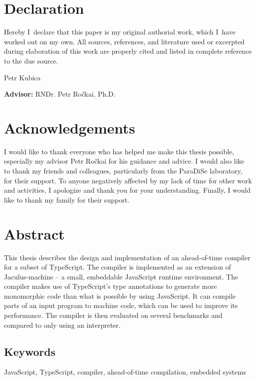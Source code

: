 \section*{Declaration} Hereby I~declare that this paper is my original authorial work, which
I~have worked out on my own. All sources, references, and literature
used or excerpted during elaboration of this work are properly cited
and listed in complete reference to the due source.

\vspace{1cm}
\begin{flushright}
Petr Kubica
\end{flushright}

\vfill\noindent
\textbf{Advisor:} RNDr. Petr Ročkai, Ph.D.   %
\cleardoublepage

\section*{Acknowledgements} %
I would like to thank everyone who has helped me make this thesis possible, especially my advisor Petr Ročkai for his guidance and advice. I would also like to thank my friends and colleagues, particularly from the ParaDiSe laboratory, for their support. To anyone negatively affected by my lack of time for other work and activities, I apologize and thank you for your understanding. Finally, I would like to thank my family for their support.
\cleardoublepage

\section*{Abstract} %
This thesis describes the design and implementation of an ahead-of-time compiler for a subset of TypeScript. The compiler is implemented as an extension of Jaculus-machine -- a small, embeddable JavaScript runtime environment. The compiler makes use of TypeScript's type annotations to generate more monomorphic code than what is possible by using JavaScript. It can compile parts of an input program to machine code, which can be used to improve its performance. The compiler is then evaluated on several benchmarks and compared to only using an interpreter.

\subsection*{Keywords} %
JavaScript, TypeScript, compiler, ahead-of-time compilation, embedded systems
\cleardoublepage
